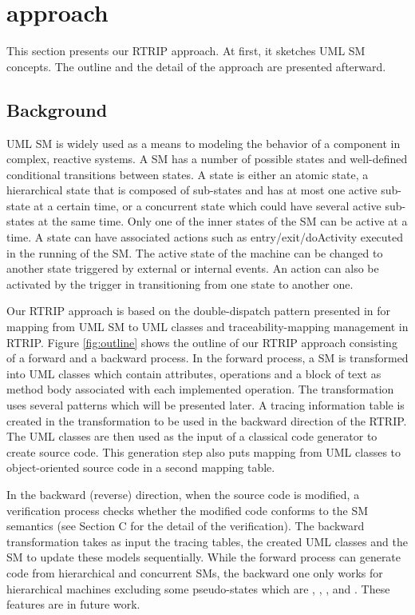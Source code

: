 \section{approach}
\label{sec:approach}
This section presents our RTRIP approach. At first, it sketches UML SM concepts. The outline and the detail of the approach are presented afterward.
\subsection{Background}
UML SM is widely used as a means to modeling the behavior of a component in complex, reactive systems. A SM has a number of possible states and well-defined conditional transitions between states. A state is either an atomic state, a hierarchical state that is composed of sub-states and has at most one active sub-state at a certain time, or a concurrent state which could have several active sub-states at the same time. Only one of the inner states of the SM can be active at a time. A state can have associated actions such as entry/exit/doActivity executed in the running of the SM. The active state of the machine can be changed to another state triggered by external or internal events. An action can also be activated by the trigger in transitioning from one state to another one.  

Our RTRIP approach is based on the double-dispatch pattern presented in \cite{spinke_object-oriented_2013} for mapping from UML SM to UML classes and traceability-mapping management in RTRIP. Figure \ref{fig:outline} shows the outline of our RTRIP approach consisting of a forward and a backward process. In the forward process, a SM is transformed into UML classes which contain attributes, operations and a block of text as method body associated with each implemented operation. The transformation uses several patterns which will be presented later. A tracing information table is created in the transformation to be used in the backward direction of the RTRIP. The UML classes are then used as the input of a classical code generator to create source code. This generation step also puts mapping from UML classes to object-oriented source code in a second mapping table.

In the backward (reverse) direction, when the source code is modified, a verification process checks whether the modified code conforms to the SM semantics (see Section C for the detail of the verification). The backward transformation takes as input the tracing tables, the created UML classes and the SM to update these models sequentially. While the forward process can generate code from hierarchical and concurrent SMs, the backward one only works for hierarchical machines excluding some pseudo-states which are , , ,  and . These features are in future work.

